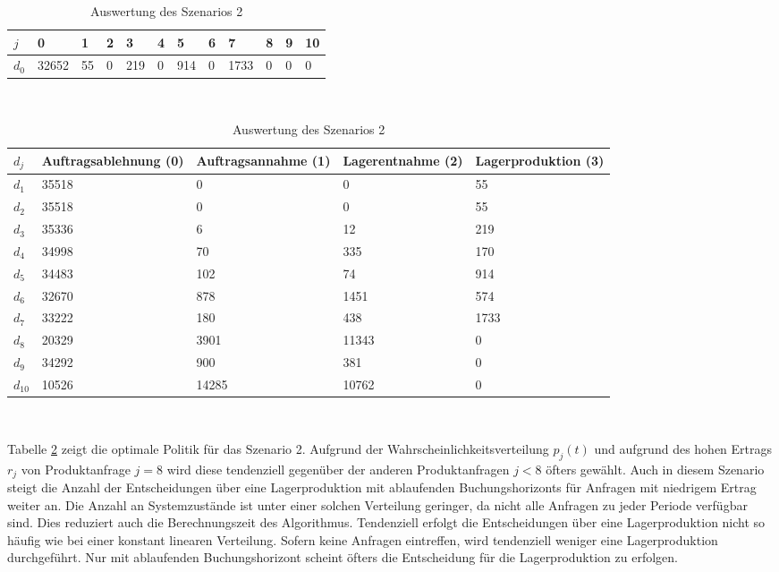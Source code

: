\begin{table}[h!]
\renewcommand{\arraystretch}{1.5}
  \begin{center}
    \caption{Auswertung des Szenarios 2}  \label{AS2}
    \vspace*{3mm}
    \begin{tabular}{l l l l l l l l l l l l }  \hline 
         $j$ & 0 & 1  & 2 & 3 & 4  & 5 & 6 & 7 & 8 & 9 & 10  \\  \hline
$d_{0}$ &  32652 &  55 &  0 &  219 &  0 &  914 &  0 &  1733 &  0 &  0 &  0 \\
\hline
    \end{tabular} \\[3mm]
        \begin{tabular}{ l p{2.5cm} p{2.5cm} p{2.5cm} p{2.5cm} }   \hline    %
    $d_j$ & Auftrags\-ablehnung (0) & Auftrags\-annahme (1)  & Lager\-entnahme (2) & Lager\-produktion (3)\\\hline 
$d_{1}$  &  35518 &    0 &    0 &    55 \\
$d_{2}$  &  35518 &    0 &    0 &    55 \\
$d_{3}$  &  35336 &      6 &     12 &   219 \\
$d_{4}$  &  34998 &     70 &    335 &   170 \\
$d_{5}$  &  34483 &    102 &     74 &   914 \\
$d_{6}$  &  32670 &    878 &   1451 &   574 \\
$d_{7}$  &  33222 &    180 &    438 &  1733 \\
$d_{8}$  &  20329 &   3901 &  11343 &   0 \\
$d_{9}$  &  34292 &    900 &    381 &   0 \\
$d_{10}$ &  10526 &  14285 &  10762 &   0 \\
          \hline
   \end{tabular} \\[3mm]
     \end{center}
\end{table}

Tabelle \ref{AS2} zeigt die optimale Politik für das Szenario 2. Aufgrund der Wahrscheinlichkeitsverteilung $p_j(t)$ und aufgrund des hohen Ertrags $r_j$ von Produktanfrage $j=8$ wird diese tendenziell gegenüber der anderen Produktanfragen $j<8$ öfters gewählt. Auch in diesem Szenario steigt die Anzahl der Entscheidungen über eine Lagerproduktion mit ablaufenden Buchungshorizonts für Anfragen mit niedrigem Ertrag weiter an. Die Anzahl an Systemzustände ist unter einer solchen Verteilung geringer, da nicht alle Anfragen zu jeder Periode verfügbar sind. Dies reduziert auch die Berechnungszeit des Algorithmus. Tendenziell erfolgt die Entscheidungen über eine Lagerproduktion nicht so häufig wie bei einer konstant linearen Verteilung. Sofern keine Anfragen eintreffen, wird tendenziell weniger eine Lagerproduktion durchgeführt. Nur mit ablaufenden Buchungshorizont scheint öfters die Entscheidung für die Lagerproduktion zu erfolgen.

